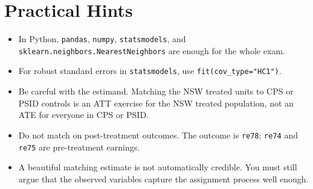 \documentclass[11pt]{article}
\begin{document}
\section*{Practical Hints}

\begin{itemize}
  \item In Python, \texttt{pandas}, \texttt{numpy}, \texttt{statsmodels}, and \texttt{sklearn.neighbors.NearestNeighbors} are enough for the whole exam.
  \item For robust standard errors in \texttt{statsmodels}, use \texttt{fit(cov\_type="HC1")}.
  \item Be careful with the estimand. Matching the NSW treated units to CPS or PSID controls is an ATT exercise for the NSW treated population, not an ATE for everyone in CPS or PSID.
  \item Do not match on post-treatment outcomes. The outcome is \texttt{re78}; \texttt{re74} and \texttt{re75} are pre-treatment earnings.
  \item A beautiful matching estimate is not automatically credible. You must still argue that the observed variables capture the assignment process well enough.
\end{itemize}
\end{document}
